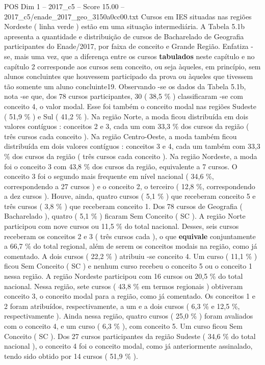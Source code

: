 \begin{textsample}{POS Dim 1 – 2017\_c5 – Score 15.00 – 2017\_c5/enade\_2017\_geo\_3150a0cc00.txt}
Cursos em IES situadas nas regiões Nordeste ( linha verde ) estão em uma situação intermediária.
A Tabela 5.1b apresenta a quantidade e distribuição de cursos de Bacharelado de Geografia participantes do Enade/2017, por faixa de conceito e Grande Região.
Enfatiza -se, mais uma vez, que a diferença entre os cursos \textbf{tabulados} neste capítulo e no capítulo 2 corresponde aos cursos sem conceito, ou seja àqueles, em princípio, sem alunos concluintes que houvessem participado da prova ou àqueles que tivessem tão somente um aluno concluinte19.
Observando -se os dados da Tabela 5.1b, nota -se que, dos 78 cursos participantes, 30 ( 38,5 \% ) classificaram -se com conceito 4, o valor modal.
Esse foi também o conceito modal nas regiões Sudeste ( 51,9 \% ) e Sul ( 41,2 \% ).
Na região Norte, a moda ficou distribuída em dois valores contíguos : conceitos 2 e 3, cada um com 33,3 \% dos cursos da região ( três cursos cada conceito ).
Na região Centro-Oeste, a moda também ficou distribuída em dois valores contíguos : conceitos 3 e 4, cada um também com 33,3 \% dos cursos da região ( três cursos cada conceito ).
Na região Nordeste, a moda foi o conceito 3 com 43,8 \% dos cursos da região, equivalente a 7 cursos.
O conceito 3 foi o segundo mais frequente em nível nacional ( 34,6 \%, correspondendo a 27 cursos ) e o conceito 2, o terceiro ( 12,8 \%, correspondendo a dez cursos ).
Houve, ainda, quatro cursos ( 5,1 \% ) que receberam conceito 5 e três cursos ( 3,8 \% ) que receberam conceito 1.
Dos 78 cursos de Geografia ( Bacharelado ), quatro ( 5,1 \% ) ficaram Sem Conceito ( SC ).
A região Norte participou com nove cursos ou 11,5 \% do total nacional.
Desses, seis cursos receberam os conceitos 2 e 3 ( três cursos cada ), o que \textbf{equivale} conjuntamente a 66,7 \% do total regional, além de serem os conceitos modais na região, como já comentado.
A dois cursos ( 22,2 \% ) atribuiu -se conceito 4.
Um curso ( 11,1 \% ) ficou Sem Conceito ( SC ) e nenhum curso recebeu o conceito 5 ou o conceito 1 nessa região.
A região Nordeste participou com 16 cursos ou 20,5 \% do total nacional.
Nessa região, sete cursos ( 43,8 \% em termos regionais ) obtiveram conceito 3, o conceito modal para a região, como já comentado.
Os conceitos 1 e 2 foram atribuídos, respectivamente, a um e a dois cursos ( 6,3 \% e 12,5 \%, respectivamente ).
Ainda nessa região, quatro cursos ( 25,0 \% ) foram avaliados com o conceito 4, e um curso ( 6,3 \% ), com conceito 5.
Um curso ficou Sem Conceito ( SC ).
Dos 27 cursos participantes da região Sudeste ( 34,6 \% do total nacional ), o conceito 4 foi o conceito modal, como já anteriormente assinalado, tendo sido obtido por 14 cursos ( 51,9 \% ).

\end{textsample}

